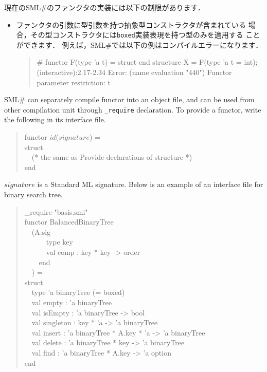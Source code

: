 \documentclass{jbook}
\newcommand{\smlsharp}{SML\#}
\newcommand{\myem}{\mbox{\ \ }}
\newenvironment{program}{\begin{quote}\begin{tt}}%
                        {\end{tt}\end{quote}}
\begin{document}
	現在の\smlsharp{}のファンクタの実装には以下の制限があります．
\begin{itemize}
\item
	ファンクタの引数に型引数を持つ抽象型コンストラクタが含まれている
場合，その型コンストラクタには{\tt boxed}実装表現を持つ型のみを適用する
ことができます．
	例えば，\smlsharp{}では以下の例はコンパイルエラーになります．
\begin{program}
\# functor F(type 'a t) = struct end
   structure X = F(type 'a t = int);
(interactive):2.17-2.34 Error:
  (name evaluation "440") Functor parameter restriction: t
\end{program}
\end{itemize}


\else%
	\smlsharp{} can separately compile functor into an object file,
and can be used from other compilation unit through {\tt \_require}
declaration.
	To provide a functor, write the following in its interface file.
\begin{program}
functor $id$($signature$) =\\
struct\\
\myem (* the same as Provide declarations of structure *)\\
end
\end{program}
	$signature$ is a Standard ML signature.
	Below is an example of an interface file for binary search tree.
\begin{program}
\_require "basis.smi"\\
functor BalancedBinaryTree\\
\myem  (A:sig\\
\myem\myem\myem      type key\\
\myem\myem\myem      val comp : key * key -> order\\
\myem\myem    end\\
\myem  ) =\\
struct\\
\myem type 'a binaryTree (= boxed)\\
\myem  val empty : 'a binaryTree\\
\myem  val isEmpty : 'a binaryTree -> bool\\
\myem  val singleton : key * 'a -> 'a binaryTree\\
\myem  val insert : 'a binaryTree * A.key * 'a -> 'a binaryTree\\
\myem  val delete : 'a binaryTree * key -> 'a binaryTree\\
\myem  val find : 'a binaryTree * A.key -> 'a option\\
end
\end{program}
\end{document}
